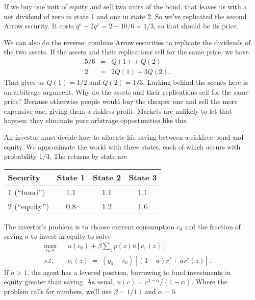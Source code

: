 \documentclass[11pt]{exam}
\begin{document}
\begin{questions}
\begin{solution}
\begin{parts}
\item If we buy one unit of equity and sell two units of the bond,
that leaves us with a net dividend of zero in state 1 and one in state 2.
So we've replicated the second Arrow security.
It costs $ q^e - 2 q^1 = 2 - 10/6 = 1/3 $, so that should be its price.

\item We can also do the reverse:  combine Arrow securities to replicate
the dividends of the two assets.
If the assets and their replications sell for the same price,
we have
\begin{eqnarray*}
    5/6 &=&  Q(1) + Q(2) \\
    2   &=& 2 Q(1) + 3 Q(2) .
\end{eqnarray*}
That gives us $Q(1) = 1/2$ and $Q(2) = 1/3$.
Lurking behind the scenes here is an arbitrage argument.
Why do the assets and their replications sell for the same price?
Because otherwise people would buy the cheaper one and sell the more expensive one,
giving them a riskless profit.
Markets are unlikely to let that happen:  they eliminate pure arbitrage opportunities like this.

\end{parts}
\end{solution}


An investor must decide how to allocate his saving
between a riskfree bond and equity.
We approximate the world with three states,
each of which occurs with probability $1/3$.
The returns by state are

\begin{center}
\begin{tabular}{lccc}
\toprule
Security  &  State 1 & State 2 & State 3\\
\midrule
1 (``bond'')    &  1.1    &   1.1  &  1.1 \\
2 (``equity'')  &  0.8    &   1.2  &  1.6 \\
\bottomrule
\end{tabular}
\end{center}


The investor's problem is to choose current consumption $c_0$
and the fraction of saving $a$ to invest in equity to solve
\begin{eqnarray*}
   \max_{c_0, a} &&  u(c_0) + \beta \sum_z p(z) u[c_1(z)] \\
        s.t. &&  c_1(z)\;=\; (y_0-c_0)[(1-a) r^1 + a r^e(z)] .
\end{eqnarray*}
If $a>1$, the agent has a levered position, borrowing to fund investments in equity greater
than saving.
As usual, $u(c) = c^{1-\alpha}/(1-\alpha)$.
Where the problem calls for numbers, we'll use $\beta = 1/1.1$ and $\alpha = 5$.


\end{questions}
\end{document}
